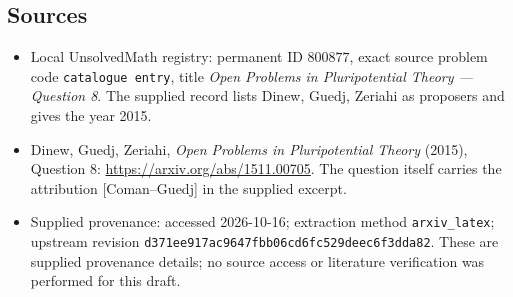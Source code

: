 \documentclass[11pt]{article}
\begin{document}
\subsection{Sources}
\begin{itemize}
\item Local UnsolvedMath registry: permanent ID \(800877\), exact source problem code \texttt{catalogue entry}, title \emph{Open Problems in Pluripotential Theory --- Question 8}. The supplied record lists Dinew, Guedj, Zeriahi as proposers and gives the year 2015.
\item Dinew, Guedj, Zeriahi, \emph{Open Problems in Pluripotential Theory} (2015), Question 8: \url{https://arxiv.org/abs/1511.00705}. The question itself carries the attribution \textnormal{[Coman--Guedj]} in the supplied excerpt.
\item Supplied provenance: accessed 2026-10-16; extraction method \texttt{arxiv\_latex}; upstream revision \texttt{d371ee917ac9647fbb06cd6fc529deec6f3dda82}. These are supplied provenance details; no source access or literature verification was performed for this draft.
\end{itemize}
\end{document}
